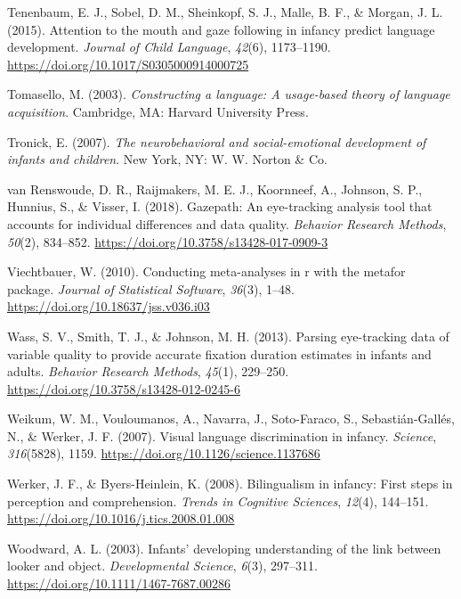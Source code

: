\documentclass[
  english,
  ,man,floatsintext]{apa6}
\begin{document}
\leavevmode\hypertarget{ref-Tenenbaum_etal_2015}{}%
Tenenbaum, E. J., Sobel, D. M., Sheinkopf, S. J., Malle, B. F., \& Morgan, J. L. (2015). Attention to the mouth and gaze following in infancy predict language development. \emph{Journal of Child Language}, \emph{42}(6), 1173--1190. \url{https://doi.org/10.1017/S0305000914000725}

\leavevmode\hypertarget{ref-Tomasello_2003}{}%
Tomasello, M. (2003). \emph{Constructing a language: A usage-based theory of language acquisition}. Cambridge, MA: Harvard University Press.

\leavevmode\hypertarget{ref-Tronick_2007}{}%
Tronick, E. (2007). \emph{The neurobehavioral and social-emotional development of infants and children}. New York, NY: W. W. Norton \& Co.

\leavevmode\hypertarget{ref-vanRenswoude_etal_2018}{}%
van Renswoude, D. R., Raijmakers, M. E. J., Koornneef, A., Johnson, S. P., Hunnius, S., \& Visser, I. (2018). Gazepath: An eye-tracking analysis tool that accounts for individual differences and data quality. \emph{Behavior Research Methods}, \emph{50}(2), 834--852. \url{https://doi.org/10.3758/s13428-017-0909-3}

\leavevmode\hypertarget{ref-Viechtbauer_2010}{}%
Viechtbauer, W. (2010). Conducting meta-analyses in r with the metafor package. \emph{Journal of Statistical Software}, \emph{36}(3), 1--48. \url{https://doi.org/10.18637/jss.v036.i03}

\leavevmode\hypertarget{ref-Wass_etal_2013}{}%
Wass, S. V., Smith, T. J., \& Johnson, M. H. (2013). Parsing eye-tracking data of variable quality to provide accurate fixation duration estimates in infants and adults. \emph{Behavior Research Methods}, \emph{45}(1), 229--250. \url{https://doi.org/10.3758/s13428-012-0245-6}

\leavevmode\hypertarget{ref-Weikum_etal_2007}{}%
Weikum, W. M., Vouloumanos, A., Navarra, J., Soto-Faraco, S., Sebastián-Gallés, N., \& Werker, J. F. (2007). Visual language discrimination in infancy. \emph{Science}, \emph{316}(5828), 1159. \url{https://doi.org/10.1126/science.1137686}

\leavevmode\hypertarget{ref-Werker_Byers-Heinlein_2008}{}%
Werker, J. F., \& Byers-Heinlein, K. (2008). Bilingualism in infancy: First steps in perception and comprehension. \emph{Trends in Cognitive Sciences}, \emph{12}(4), 144--151. \url{https://doi.org/10.1016/j.tics.2008.01.008}

\leavevmode\hypertarget{ref-Woodward_2003}{}%
Woodward, A. L. (2003). Infants' developing understanding of the link between looker and object. \emph{Developmental Science}, \emph{6}(3), 297--311. \url{https://doi.org/10.1111/1467-7687.00286}
\end{document}
